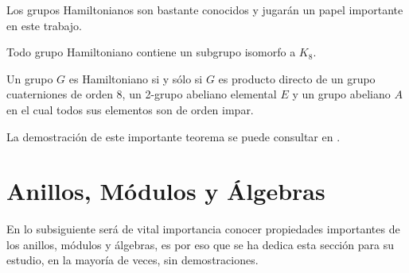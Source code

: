 Los grupos Hamiltonianos son bastante conocidos y jugarán un papel importante en este trabajo.
\begin{lema}
Todo grupo Hamiltoniano contiene un subgrupo isomorfo a $K_8$.
\end{lema}
\begin{teorema}
Un grupo $G$ es Hamiltoniano si y sólo si $G$ es producto directo de un grupo cuaterniones de orden 8, un 2-grupo abeliano elemental $E$ y un grupo abeliano $A$ en el cual todos sus elementos son de orden impar.
\end{teorema}
La demostración de este importante teorema se puede consultar en \cite[página 130]{bib:groupBook}.
\section{Anillos, Módulos y Álgebras}
En lo subsiguiente será de vital importancia conocer propiedades importantes de los anillos, módulos y álgebras, es por eso que se ha dedica esta sección para su estudio, en la mayoría de veces, sin demostraciones.
